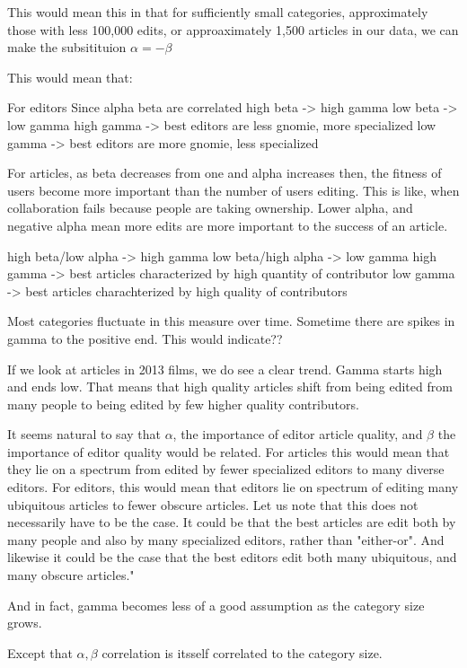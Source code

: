 \documentclass{acm_proc_article-sp}
\begin{document}
This would mean this in that for sufficiently small categories, approximately those with less  100,000 edits, or approaximately 1,500 articles in our data, we can make the subsitituion $\alpha = - \beta$


This would mean that:

For editors
Since alpha beta are correlated 
high beta -> high gamma
low beta -> low gamma
high gamma -> best editors are less gnomie, more specialized
low gamma -> best editors are more gnomie, less specialized


For articles, as beta decreases from one and alpha increases then, the fitness of users become more important than the number of users editing. This is like, when collaboration fails because people are taking ownership. Lower alpha, and negative alpha mean more edits are more important to the success of an article.

high beta/low alpha -> high gamma
low beta/high alpha -> low gamma
high gamma -> best articles characterized by high quantity of contributor
low gamma -> best articles charachterized by high quality of contributors


Most categories fluctuate in this measure over time. Sometime there are spikes in gamma to the positive end. This would indicate??

If we look at articles in 2013 films, we do see a clear trend. Gamma starts high and ends low. That means that high quality articles shift from being edited from many people to being edited by few higher quality contributors.

It seems natural to say that $\alpha$, the importance of editor article quality, and $\beta$ the importance of editor quality would be related. For articles this would mean that they lie on a spectrum from  edited by fewer specialized editors to  many diverse editors. For editors, this would mean that editors lie on spectrum of editing many ubiquitous articles to fewer obscure articles. Let us note that this does not necessarily have to be the case. It could be that the best articles are edit both by many people and also by many specialized editors, rather than "either-or". And likewise it could be the case that  the best editors edit both many ubiquitous, and many obscure articles."

And in fact, gamma becomes less of a good assumption as the category size grows. 

Except that $\alpha , \beta$ correlation is itsself correlated to the category size.
\end{document}
